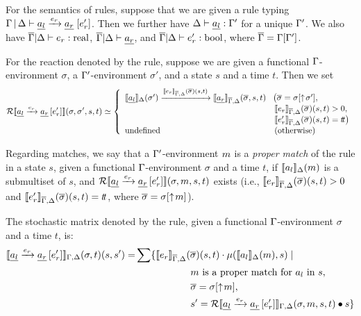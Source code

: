 For the semantics of rules, suppose that we are given a rule typing
$\Gamma\,|\, \Delta \vdash \underline{a_l} \xrightarrow{e_r} \underline{a_r} \; [e'_r]$. Then we further
have $\Delta \vdash \underline{a_l} : \Gamma'$ for a unique $\Gamma'$.  We also have
$\overline{\Gamma}|\Delta \vdash e_r : \mathrm{real}$,
$ \overline{\Gamma}|\Delta \vdash \underline{a_r}$, and
$ \overline{\Gamma}|\Delta \vdash e'_r : \mathrm{bool}$, where $\overline{\Gamma} = \Gamma[\Gamma']$.

For the reaction denoted by the rule, suppose we are given a functional
$\Gamma$-environment $\sigma$, a $\Gamma'$-environment $\sigma'$, and a state $s$ and a time
$t$. Then we set
\begin{equation*}
\mathcal{R}\llbracket \underline{a_l} \xrightarrow{e_r} \underline{a_r} \, [e'_r] \rrbracket(\sigma, \sigma', s, t) \simeq \left\{ 
\begin{array}{ll}
\llbracket \underline{a_l} \rrbracket_{\Delta}(\sigma') \xrightarrow{\llbracket e_r \rrbracket_{\overline{\Gamma},\Delta}(\overline{\sigma})(s, t)} \llbracket \underline{a_r} \rrbracket_{\overline{\Gamma}, \Delta}(\overline{\sigma}, s, t)  &  \! \big(\overline{\sigma} = \sigma[\uparrow\! \sigma'],  \\ 
  & \llbracket e_r \rrbracket_{\overline{\Gamma},\Delta}(\overline{\sigma})( s, t) > 0, \\ 
  & \llbracket e'_r \rrbracket_{\overline{\Gamma},\Delta}(\overline{\sigma})( s, t) = t\!t \big) 
 \\
\text{undefined } & (\text{otherwise})
\end{array}
\right .
\end{equation*}

Regarding matches, we say that a $\Gamma'$-environment $m$ is a \emph{proper
  match} of the rule in a state $s$, given a functional $\Gamma$-environment
$\sigma$ and a time $t$, if $\llbracket a_l \rrbracket_{\Delta}( m)$ is a submultiset of $s$, and
$\mathcal{R}\llbracket \underline{a_l} \xrightarrow{e_r} \underline{a_r} \, [e'_r] \rrbracket(\sigma, m, s, t) $
exists (i.e., $ \llbracket e_r \rrbracket_{\overline{\Gamma},\Delta}(\overline{\sigma})( s, t) > 0$ and
$\llbracket e'_r \rrbracket_{\overline{\Gamma},\Delta}(\overline{\sigma})( s, t) = t\!t $, where
$\overline{\sigma} = \sigma[\uparrow\! m]$).


The stochastic matrix denoted by the rule, given a functional $\Gamma$-environment $\sigma$ and a time $t$, is:
\begin{equation*}
\begin{split}
\llbracket 
{\underline{a_l} \xrightarrow{e_r} \underline{a_r} \, [e'_r]} \rrbracket_{\Gamma,\Delta}(\sigma, t) (s,s') = & \sum\{\llbracket e_r \rrbracket_{\overline{ \Gamma},\Delta}(\overline{\sigma})(s, t) \cdot \mu(\llbracket a_l \rrbracket_{ \Delta}(m),s) \mid \\
 & \hspace{2.0cm} m \mbox{ is a proper match for } a_l \mbox{ in } s,\\ 
 & \hspace{2.0cm} \overline{\sigma} = \sigma[\uparrow\!  m],   \\
 & \hspace{2.0cm} s' = \mathcal{R}\llbracket {\underline{a_l} \xrightarrow{e_r} \underline{a_r} \, [e'_r]} \rrbracket_{\Gamma,\Delta}(\sigma,m, s, t) \bullet s \}
\end{split}
\end{equation*}

